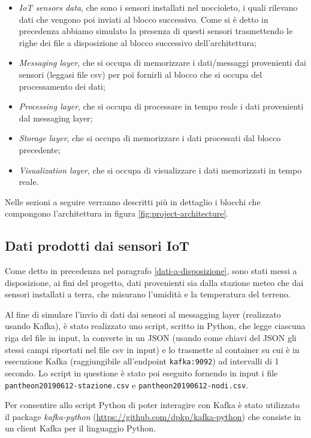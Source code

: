 \begin{itemize}
    \item \textit{IoT sensors data}, che sono i sensori installati nel noccioleto, i quali rilevano dati che vengono poi inviati al blocco successivo. Come si è detto in precedenza abbiamo simulato la presenza di questi sensori trasmettendo le righe dei file a disposizione al blocco successivo dell'architettura;
    \item \textit{Messaging layer}, che si occupa di memorizzare i dati/messaggi provenienti dai sensori (leggasi file csv) per poi fornirli al blocco che si occupa del processamento dei dati;
    \item \textit{Processing layer}, che si occupa di processare in tempo reale i dati provenienti dal messaging layer;
    \item \textit{Storage layer}, che si occupa di memorizzare i dati processati dal blocco precedente;
    \item \textit{Visualization layer}, che si occupa di visualizzare i dati memorizzati in tempo reale.
\end{itemize}{}

Nelle sezioni a seguire verranno descritti più in dettaglio i blocchi che compongono l'architettura in figura \ref{fig:project-architecture}.

\subsection{Dati prodotti dai sensori IoT}
Come detto in precedenza nel paragrafo \ref{dati-a-disposizione}, sono stati messi a disposizione, ai fini del progetto, dati provenienti sia dalla stazione meteo che dai sensori installati a terra, che misurano l'umidità e la temperatura del terreno.\par

Al fine di simulare l'invio di dati dai sensori al messagging layer (realizzato usando Kafka), è stato realizzato uno script, scritto in Python, che legge ciascuna riga del file in input, la converte in un JSON (usando come chiavi del JSON gli stessi campi riportati nel file csv in input) e lo trasmette al container su cui è in esecuzione Kafka (raggiungibile all'endpoint \texttt{kafka:9092}) ad intervalli di 1 secondo. Lo script in questione è stato poi eseguito fornendo in input i file \texttt{pantheon20190612-stazione.csv} e \texttt{pantheon20190612-nodi.csv}.\par

Per consentire allo script Python di poter interagire con Kafka è stato utilizzato il package \textit{kafka-python} (\url{https://github.com/dpkp/kafka-python}) che consiste in un client Kafka per il linguaggio Python.

